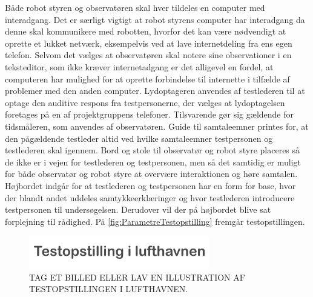 Både robot styren og observatøren skal hver tildeles en computer med interadgang. Det er særligt vigtigt at robot styrens computer har interadgang da denne skal kommunikere med robotten, hvorfor det kan være nødvendigt at oprette et lukket netværk, eksempelvis ved at lave internetdeling fra ens egen telefon. Selvom det vælges at observatøren skal notere sine observationer i en teksteditor, som ikke kræver internetadgang er det alligevel en fordel, at computeren har mulighed for at oprette forbindelse til internette i tilfælde af problemer med den anden computer. Lydoptageren anvendes af testlederen til at optage den auditive respons fra testpersonerne, der vælges at lydoptagelsen foretages på en af projektgruppens telefoner. Tilsvarende gør sig gældende for tidsmåleren, som anvendes af observatøren. Guide til samtaleemner printes for, at den pågældende testleder altid ved hvilke samtaleemner testpersonen og testlederen skal igennem. Bord og stole til observatør og robot styre placeres så de ikke er i vejen for testlederen og testpersonen, men så det samtidig er muligt for både observatør og robot styre at overvære interaktionen og høre samtalen. Højbordet indgår for at testlederen og testpersonen har en form for base, hvor der blandt andet uddeles samtykkeerklæringer og hvor testlederen introducere testpersonen til undersøgelsen. Derudover vil der på højbordet blive sat forplejning til rådighed. På \autoref{fig:ParametreTestopstilling} fremgår testopstillingen.   
%
\begin{figure}[H]
\centering
\includegraphics[width = 0.7\textwidth]{Figure/ParametreTestopstilling} 
\caption{TAG ET BILLED ELLER LAV EN ILLUSTRATION AF TESTOPSTILLINGEN I LUFTHAVNEN.}
\label{fig:ParametreTestopstilling}
\end{figure}
\noindent
%  

